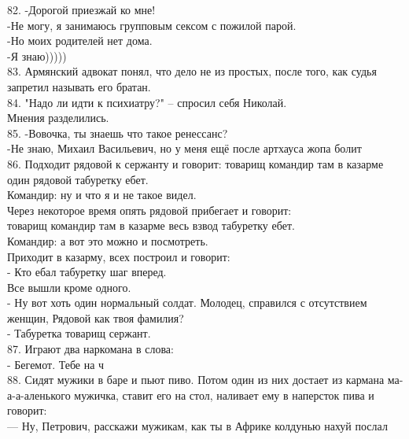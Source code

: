 \documentclass[a4paper,20pt,notitlepage]{extbook}
\begin{document}
	82. -Дорогой приезжай ко мне!\\
	-Не могу, я занимаюсь групповым сексом с пожилой парой.\\
	-Но моих родителей нет дома.\\
	-Я знаю)))))\\
	
	83. Армянский адвокат понял, что дело не из простых, после того, как судья запретил называть его братан.\\
	
	84. "Надо ли идти к психиатру?" – спросил себя Николай.\\
	Мнения разделились.\\
	
	85. -Вовочка, ты знаешь что такое ренессанс?\\
	-Не знаю, Михаил Васильевич, но у меня ещё после артхауса жопа болит\\
	
	86. Подходит рядовой к сержанту и говорит: товарищ командир там в казарме
	один рядовой табуретку ебет.\\
	Командир: ну и что я и не такое видел.\\
	Через некоторое время опять рядовой прибегает и говорит: \\
	товарищ	командир там в казарме весь взвод табуретку ебет.\\
	Командир: а вот это можно и посмотреть. \\
	Приходит в казарму, всех построил и говорит: \\
	- Кто ебал табуретку шаг вперед. \\
	Все вышли кроме одного.\\
	- Ну вот хоть один нормальный солдат. Молодец, справился с отсутствием женщин, Рядовой как твоя фамилия? \\
	- Табуретка товарищ сержант.\\
	
	87. Играют два наркомана в слова:\\
	- Бегемот. Тебе на ч\\
	
	88. Сидят мужики в баре и пьют пиво. Потом один из них достает из кармана ма-а-а-аленького мужичка, ставит его на стол, наливает ему в наперсток пива и говорит:\\
	— Ну, Петрович, расскажи мужикам, как ты в Африке колдунью нахуй послал\\
	
\end{document}
